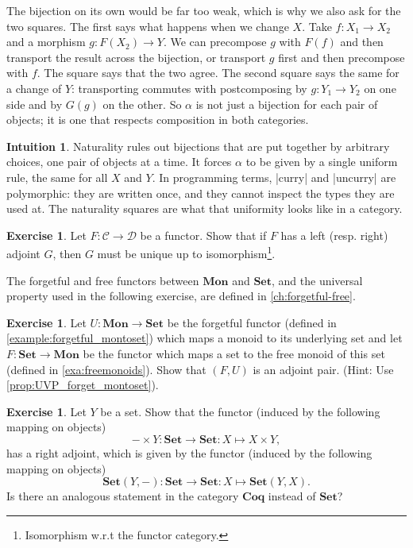 \documentclass[a4paper,11pt, oneside,titlepage=false]{scrbook}
\theoremstyle{plain}
\theoremstyle{definition}
\newtheorem{exer}[thm]{Exercise}
\newtheorem{intu}[thm]{Intuition}
\newcommand{\Cat}[1]{\mathcal{#1}}
\newcommand{\CC}{\Cat{C}}
\newcommand{\DD}{\Cat{D}}
\newcommand{\Catb}[1]{\mathbf{#1}}
\newcommand{\SET}{\Catb{Set}}
\newcommand{\MON}{\Catb{Mon}}
\newcommand{\COQ}{\Catb{Coq}}
\newcommand{\CHom}[3]{{#1}(#2,#3)}
\begin{document}
The bijection on its own would be far too weak, which is why we also ask for
the two squares.
The first says what happens when we change $X$.
Take $f : X_1 \to X_2$ and a morphism $g : F(X_2) \to Y$.
We can precompose $g$ with $F(f)$ and then transport the result across the
bijection, or transport $g$ first and then precompose with $f$.
The square says that the two agree.
The second square says the same for a change of $Y$: transporting commutes with
postcomposing by $g : Y_1 \to Y_2$ on one side and by $G(g)$ on the other.
So $\alpha$ is not just a bijection for each pair of objects; it is one that
respects composition in both categories.

\begin{intu}
  Naturality rules out bijections that are put together by arbitrary choices,
  one pair of objects at a time.
  It forces $\alpha$ to be given by a single uniform rule, the same for all $X$
  and $Y$.
  In programming terms, |curry| and |uncurry| are polymorphic: they are written
  once, and they cannot inspect the types they are used at.
  The naturality squares are what that uniformity looks like in a category.
\end{intu}

\begin{exer} Let $F:\CC\to\DD$ be a functor. Show that if $F$ has a left (resp. right) adjoint $G$, then $G$ must be unique up to isomorphism\footnote{Isomorphism w.r.t the functor category.}.
\end{exer}

The forgetful and free functors between $\MON$ and $\SET$, and the universal property used in the following exercise, are defined in \cref{ch:forgetful-free}.
\begin{exer} Let $U:\MON\to \SET$ be the forgetful functor (defined in \cref{example:forgetful_montoset}) which maps a monoid to its underlying set and let $F : \SET\to\MON$ be the functor which maps a set to the free monoid of this set (defined in \cref{exa:freemonoids}). Show that $(F,U)$ is an adjoint pair. (Hint: Use \cref{prop:UVP_forget_montoset}).
\end{exer}

\begin{exer}\label{exer:adjunction_homtensor_currying} Let $Y$ be a set. Show that the functor (induced by the following mapping on objects)
\[
- \times Y : \SET\to \SET: X\mapsto X\times Y,
\]
has a right adjoint, which is given by the functor (induced by the following mapping on objects)
\[
\CHom{\SET}{Y}{-} : \SET\to\SET : X\mapsto \CHom{\SET}{Y}{X}.
\]
Is there an analogous statement in the category $\COQ$ instead of $\SET$?
\end{exer}
\end{document}
